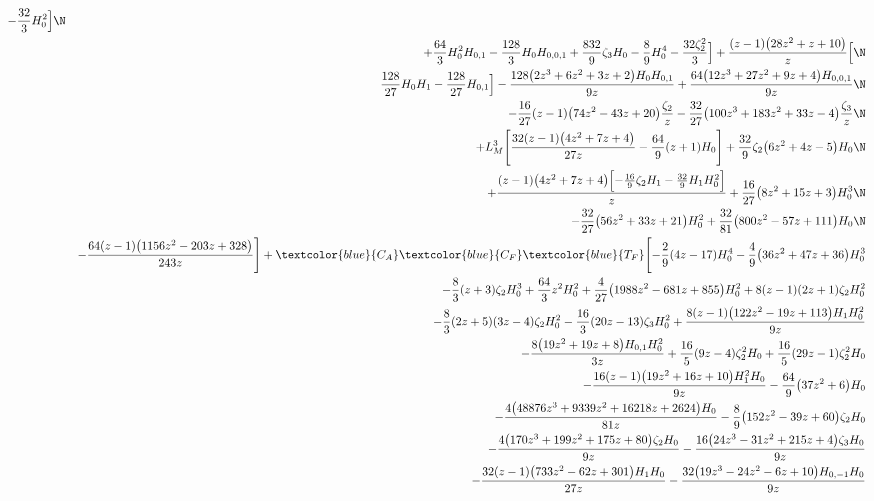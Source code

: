 \begin{eqnarray}
-\frac{32}{3} H_0^2\Bigr]
\N\\&&
+\frac{64}{3} H_0^2 H_{0,1}
-\frac{128}{3} H_0 H_{0,0,1}
+\frac{832}{9} \zeta_3 H_0
-\frac{8}{9} H_0^4
-\frac{32 \zeta_2^2}{3}\Bigr]
+\frac{(z-1) \big(28 z^2+z+10\big) }{z}
\Bigl[
\N\\&&
\frac{128}{27} H_0 H_1
-\frac{128}{27} H_{0,1}\Bigr]
-\frac{128 \big(2 z^3+6 z^2+3 z+2\big) H_0 H_{0,1}}{9 z}
+\frac{64 \big(12 z^3+27 z^2+9 z+4\big) H_{0,0,1}}{9 z}
\N\\&&
-\frac{16}{27} (z-1) \big(74 z^2-43 z+20\big) \frac{\zeta_2}{z}
-\frac{32}{27} \big(100 z^3+183 z^2+33 z-4\big) \frac{\zeta_3}{z}
\N\\&&
+ L_M^3 \Biggl[
\frac{32 (z-1) \big(4 z^2+7 z+4\big)}{27 z}
-\frac{64}{9} (z+1) H_0\Biggr]
+\frac{32}{9} \zeta_2 \big(6 z^2+4 z-5\big) H_0
\N\\&&
+\frac{(z-1) \big(4 z^2+7 z+4\big) \Bigl[
-\frac{16}{9} \zeta_2 H_1
-\frac{32}{9} H_1 H_0^2\Bigr]}{z}
+\frac{16}{27} \big(8 z^2+15 z+3\big) H_0^3
\N\\&&
-\frac{32}{27} \big(56 z^2+33 z+21\big) H_0^2
+\frac{32}{81} \big(800 z^2-57 z+111\big) H_0
\N\\&&
-\frac{64 (z-1) \big(1156 z^2-203 z+328\big)}{243 z}\Biggr]
%
+\textcolor{blue}{C_A} 
\textcolor{blue}{C_F}
\textcolor{blue}{T_F}
\Biggl[-\frac{2}{9} (4 z-17) H_0^4-\frac{4}{9} \big(36 z^2+47 z+36\big)H_0^3
\nonumber\\&&
-\frac{8}{3} (z+3) \zeta_2 H_0^3
+\frac{64}{3}  z^2 H_0^2+\frac{4}{27} \big(1988 z^2-681 z+855\big)H_0^2+8  (z-1) (2 z+1) \zeta_2 H_0^2
\nonumber\\&&
-\frac{8}{3} (2 z+5) (3 z-4) \zeta_2 H_0^2-\frac{16}{3} (20 z-13)\zeta_3 H_0^2+\frac{8 (z-1) \big(122 z^2-19 z+113\big) H_1 H_0^2}{9 z}
\nonumber\\&&
-\frac{8 \big(19 z^2+19 z+8\big) H_{0,1} H_0^2}{3 z}+\frac{16}{5} (9 z-4)\zeta_2^2 H_0+\frac{16}{5}  (29 z-1) \zeta_2^2 H_0
\nonumber\\&&
-\frac{16 (z-1) \big(19 z^2+16 z+10\big) H_1^2 H_0}{9 z}-\frac{64}{9} \big(37 z^2+6\big) H_0
\nonumber\\&&
-\frac{4 \big(48876 z^3+9339 z^2+16218 z+2624\big) H_0}{81 z}-\frac{8}{9} \big(152 z^2-39 z+60\big) \zeta_2 H_0
\nonumber\\&&
-\frac{4 \big(170 z^3+199 z^2+175 z+80\big) \zeta_2 H_0}{9 z}-\frac{16 \big(24 z^3-31 z^2+215 z+4\big) \zeta_3 H_0}{9 z}
\nonumber\\&&
-\frac{32 (z-1) \big(733 z^2-62 z+301\big) H_1 H_0}{27 z}-\frac{32 \big(19  z^3-24 z^2-6 z+10\big) H_{0,-1} H_0}{9 z}

\end{eqnarray}
